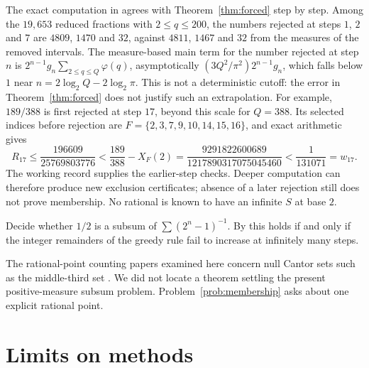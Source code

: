 \documentclass[11pt]{article}
\begin{document}
The exact computation in \cite{plectisinvestigation} agrees with
Theorem~\ref{thm:forced} step by step.  Among the $19{,}653$ reduced fractions
with $2\le q\le200$, the numbers rejected at steps $1$, $2$ and $7$ are $4809$,
$1470$ and $32$, against $4811$, $1467$ and $32$ from the measures of the
removed intervals.  The measure-based main term for the number rejected at step $n$ is
$2^{n-1}g_n\sum_{2\le q\le Q}\varphi(q)$, asymptotically $(3Q^2/\pi^2)2^{n-1}g_n$,
which falls below $1$ near $n=2\log_2Q-2\log_2\pi$.  This is not a
deterministic cutoff: the error in Theorem~\ref{thm:forced} does not justify
such an extrapolation.  For example, $189/388$ is first rejected at step $17$,
beyond this scale for $Q=388$.  Its selected indices before rejection are
$F=\{2,3,7,9,10,14,15,16\}$, and exact arithmetic gives
\[
 R_{17}\le\frac{196609}{25769803776}
 <\frac{189}{388}-X_F(2)
 =\frac{9291822600689}{1217890317075045460}
 <\frac1{131071}=w_{17}.
\]
The working record supplies the earlier-step checks.  Deeper computation can
therefore produce new exclusion certificates; absence of a later rejection
still does not prove membership.  No rational is known to have an infinite
$S$ at base $2$.

\begin{problem}\label{prob:membership}
Decide whether $1/2$ is a subsum of $\sum(2^n-1)^{-1}$.  By
\cite[Theorem~7]{plectis257} this holds if and only if the integer remainders
of the greedy rule fail to increase at infinitely many steps.
\end{problem}

The rational-point counting papers examined here concern null Cantor sets
such as the middle-third set \cite{rstw2019,chowvarjuyu2024}.  We did not locate
a theorem settling the present positive-measure subsum problem.
Problem~\ref{prob:membership} asks about one explicit rational point.

\section{Limits on methods}\label{sec:second}
\end{document}
